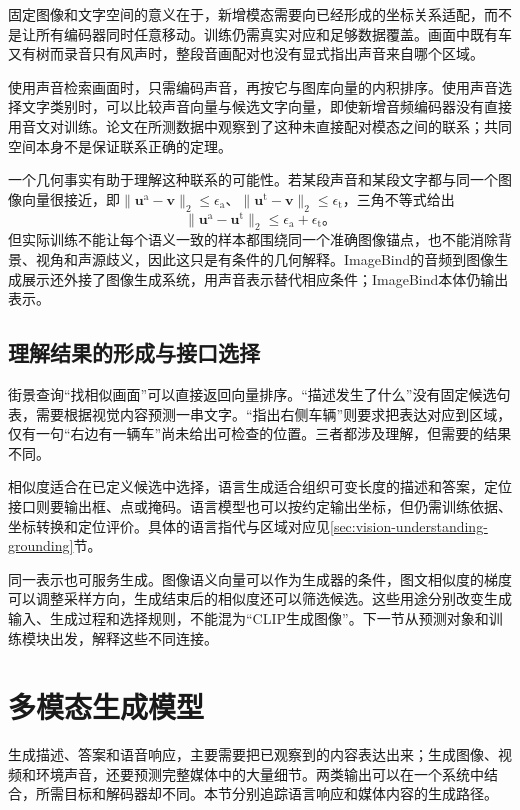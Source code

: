 固定图像和文字空间的意义在于，新增模态需要向已经形成的坐标关系适配，而不是让所有编码器同时任意移动。训练仍需真实对应和足够数据覆盖。画面中既有车又有树而录音只有风声时，整段音画配对也没有显式指出声音来自哪个区域。

使用声音检索画面时，只需编码声音，再按它与图库向量的内积排序。使用声音选择文字类别时，可以比较声音向量与候选文字向量，即使新增音频编码器没有直接用音文对训练。论文在所测数据中观察到了这种未直接配对模态之间的联系；共同空间本身不是保证联系正确的定理。

一个几何事实有助于理解这种联系的可能性。若某段声音和某段文字都与同一个图像向量很接近，即$\lVert\bm{u}^{\mathrm a}-\bm v\rVert_2\leq\epsilon_{\mathrm a}$、$\lVert\bm{u}^{\mathrm t}-\bm v\rVert_2\leq\epsilon_{\mathrm t}$，三角不等式给出
\[
  \lVert\bm{u}^{\mathrm a}-\bm{u}^{\mathrm t}\rVert_2
  \leq\epsilon_{\mathrm a}+\epsilon_{\mathrm t}\text{。}
\]
但实际训练不能让每个语义一致的样本都围绕同一个准确图像锚点，也不能消除背景、视角和声源歧义，因此这只是有条件的几何解释。ImageBind的音频到图像生成展示还外接了图像生成系统，用声音表示替代相应条件；ImageBind本体仍输出表示。

\subsection{理解结果的形成与接口选择}
\label{sec:vision-models-understanding-interface}

街景查询“找相似画面”可以直接返回向量排序。“描述发生了什么”没有固定候选句表，需要根据视觉内容预测一串文字。“指出右侧车辆”则要求把表达对应到区域，仅有一句“右边有一辆车”尚未给出可检查的位置。三者都涉及理解，但需要的结果不同。

相似度适合在已定义候选中选择，语言生成适合组织可变长度的描述和答案，定位接口则要输出框、点或掩码。语言模型也可以按约定输出坐标，但仍需训练依据、坐标转换和定位评价。具体的语言指代与区域对应见\ref{sec:vision-understanding-grounding}节。

同一表示也可服务生成。图像语义向量可以作为生成器的条件，图文相似度的梯度可以调整采样方向，生成结束后的相似度还可以筛选候选。这些用途分别改变生成输入、生成过程和选择规则，不能混为“CLIP生成图像”。下一节从预测对象和训练模块出发，解释这些不同连接。

\section{多模态生成模型}
\label{sec:vision-models-generation}

生成描述、答案和语音响应，主要需要把已观察到的内容表达出来；生成图像、视频和环境声音，还要预测完整媒体中的大量细节。两类输出可以在一个系统中结合，所需目标和解码器却不同。本节分别追踪语言响应和媒体内容的生成路径。


